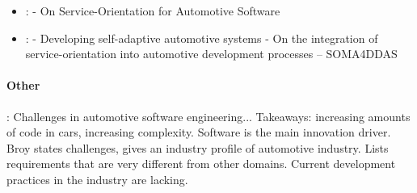\begin{itemize}
\item \cite{kugele2017service}: \citeauthor*{kugele2017service} - On Service-Orientation for Automotive Software
\item \cite{wagner2014developing}: \citeauthor*{wagner2014developing} - Developing self-adaptive automotive systems - On the integration of service-orientation into automotive
development processes -- SOMA4DDAS
\end{itemize}





\paragraph{Other}
\citeauthor*{broy2006challenges} \cite{broy2006challenges}: Challenges in automotive software engineering... Takeaways: increasing amounts of code in cars, increasing complexity. Software is the main innovation driver. Broy states challenges, gives an industry profile of automotive industry. Lists requirements that are very different from other domains. Current development practices in the industry are lacking.
